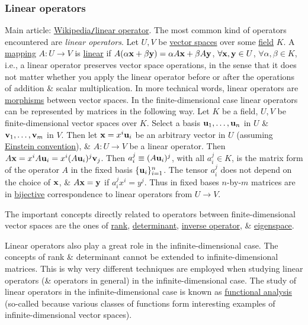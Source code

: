 \documentclass{article}
\begin{document}
\subsubsection{Linear operators}
Main article: \href{https://en.wikipedia.org/wiki/Linear_operator}{Wikipedia{\tt/}linear operator}. The most common kind of operators encountered are {\it linear operators}. Let $U,V$ be \href{https://en.wikipedia.org/wiki/Vector_space}{vector spaces} over some \href{https://en.wikipedia.org/wiki/Field_(mathematics)}{field} $K$. A \href{https://en.wikipedia.org/wiki/Map_(mathematics)}{mapping} $A:U\to V$ is \href{https://en.wikipedia.org/wiki/Linear_(mathematics)}{linear} if $A(\alpha{\bf x} + \beta{\bf y}) = \alpha A{\bf x} + \beta A{\bf y}$, $\forall{\bf x},{\bf y}\in U$, $\forall\alpha,\beta\in K$, i.e., a linear operator preserves vector space operations, in the sense that it does not matter whether you apply the linear operator before or after the operations of addition \& scalar multiplication. In more technical words, linear operators are \href{https://en.wikipedia.org/wiki/Morphism}{morphisms} between vector spaces. In the finite-dimensional case linear operators can be represented by matrices in the following way. Let $K$ be a field, $U,V$ be finite-dimensional vector spaces over $K$. Select a basis ${\bf u}_1,\ldots,{\bf u}_n$ in $U$ \& ${\bf v}_1,\ldots,{\bf v}_m$ in $V$. Then let ${\bf x} = x^i{\bf u}_i$ be an arbitrary vector in $U$ (assuming \href{https://en.wikipedia.org/wiki/Einstein_convention}{Einstein convention}), \& $A:U\to V$ be a linear operator. Then $A{\bf x} = x^iA{\bf u}_i = x^i(A{\bf u}_i)^j{\bf v}_j$. Then $a_i^j\equiv(A{\bf u}_i)^j$, with all $a_i^j\in K$, is the matrix form of the operator $A$ in the fixed basis $\{{\bf u}_i\}_{i=1}^n$. The tensor $a_i^j$ does not depend on the choice of ${\bf x}$, \& $A{\bf x} = {\bf y}$ if $a_i^jx^i = y^j$. Thus in fixed bases $n$-by-$m$ matrices are in \href{https://en.wikipedia.org/wiki/Bijective}{bijective} correspondence to linear operators from $U\to V$.

The important concepts directly related to operators between finite-dimensional vector spaces are the ones of \href{https://en.wikipedia.org/wiki/Matrix_rank}{rank}, \href{https://en.wikipedia.org/wiki/Determinant}{determinant}, \href{https://en.wikipedia.org/wiki/Inverse_operator}{inverse operator}, \& \href{https://en.wikipedia.org/wiki/Eigenspace}{eigenspace}.

Linear operators also play a great role in the infinite-dimensional case. The concepts of rank \& determinant cannot be extended to infinite-dimensional matrices. This is why very different techniques are employed when studying linear operators (\& operators in general) in the infinite-dimensional case. The study of linear operators in the infinite-dimensional case is known as \href{https://en.wikipedia.org/wiki/Functional_analysis}{functional analysis} (so-called because various classes of functions form interesting examples of infinite-dimensional vector spaces).
\end{document}
